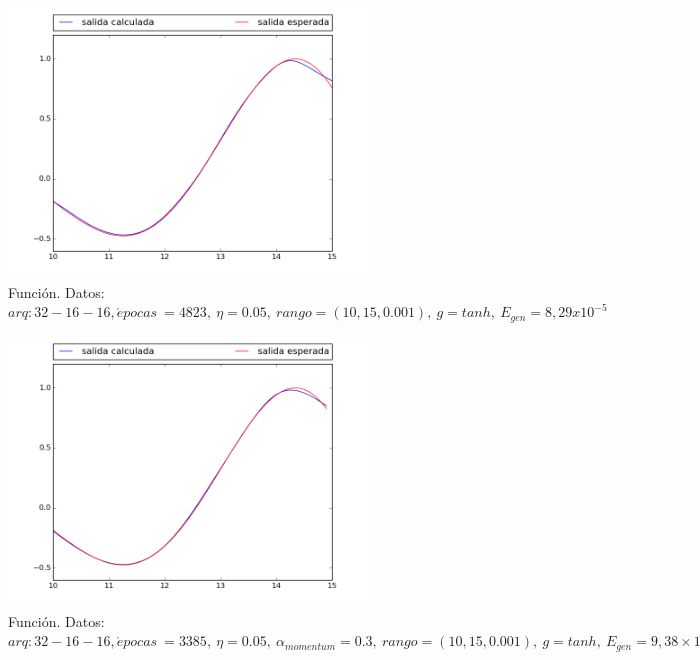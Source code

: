 \documentclass[12pt,a4paper]{article}
\begin{document}
\begin{figure}[H]
\centering
\includegraphics[width=0.85\textwidth]{img/_32_16_16_FUNCTION-0001.png}
\caption{\label{fig:test10-15-tanh-fn-32-0.001} Función. Datos:  $arq: 32-16-16, \acute{e} pocas \ = 4823, \ \eta = 0.05,\ rango=(10, 15, 0.001),\ g=tanh, \ E_{gen} = 8,29 x 10^{-5}$}
\end{figure}

\begin{figure}[H]
\centering
\includegraphics[width=0.85\textwidth]{img/_32_16_16-momentum0001.png}
\caption{\label{fig:test10-15-tanh-fn-32-momentum-0.001} Función. Datos:  $arq: 32-16-16, \acute{e} pocas \ = 3385, \ \eta = 0.05, \ \alpha_{momentum} = 0.3, \ rango=(10, 15, 0.001),\ g=tanh, \ E_{gen} =9,38 \times 10^{-5}$}
\end{figure}
\end{document}
